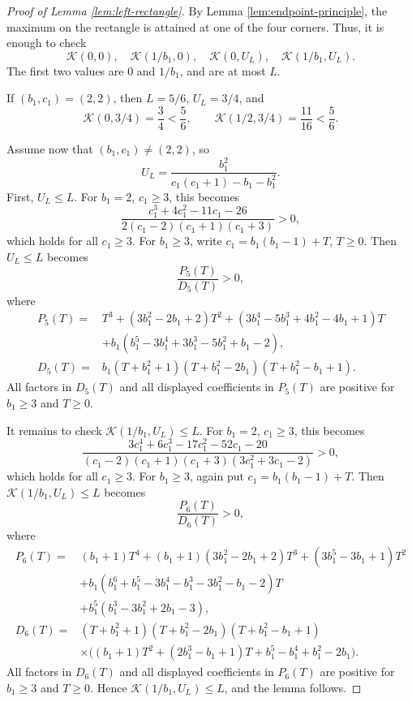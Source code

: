 \documentclass[11pt]{amsart}
\newcommand{\Kfun}{\mathcal K}
\begin{document}
\begin{proof}[Proof of Lemma \ref{lem:left-rectangle}]
By Lemma \ref{lem:endpoint-principle}, the maximum on the rectangle is attained
at one of the four corners.  Thus, it is enough to check
$$
        \Kfun(0,0),\quad
        \Kfun(1/b_1,0),\quad
        \Kfun(0,U_L),\quad
        \Kfun(1/b_1,U_L).
$$
The first two values are $0$ and $1/b_1$, and are at most $L$.

If $(b_1,c_1)=(2,2)$, then $L=5/6$, $U_L=3/4$, and
$$
        \Kfun(0,3/4)=\frac34<\frac56,
        \qquad
        \Kfun(1/2,3/4)=\frac{11}{16}<\frac56.
$$

Assume now that $(b_1,c_1)\ne(2,2)$, so
$$
        U_L=\frac{b_1^2}{c_1(c_1+1)-b_1-b_1^2}.
$$
First, $U_L\le L$.  For $b_1=2$, $c_1\geq3$, this becomes
$$
        \frac{c_1^3+4c_1^2-11c_1-26}{2(c_1-2)(c_1+1)(c_1+3)}>0,
$$
which holds for all $c_1\ge3$.
For $b_1\ge3$, write $c_1=b_1(b_1-1)+T$, $T\ge0$.  Then $U_L\le L$ becomes
$$
        \frac{P_5(T)}{D_5(T)}>0,
$$
where
\begin{align*}
P_5(T)={}&T^3+(3b_1^2-2b_1+2)T^2
        +(3b_1^4-5b_1^3+4b_1^2-4b_1+1)T\\
        &+b_1(b_1^5-3b_1^4+3b_1^3-5b_1^2+b_1-2),\\[3pt]
D_5(T)={}&b_1(T+b_1^2+1)(T+b_1^2-2b_1)(T+b_1^2-b_1+1).
\end{align*}
All factors in $D_5(T)$ and all displayed coefficients in $P_5(T)$ are positive for $b_1\ge3$ and $T\ge0$.

It remains to check $\Kfun(1/b_1,U_L)\le L$.  For $b_1=2$, $c_1\geq3$, this becomes
$$
        \frac{3c_1^4+6c_1^3-17c_1^2-52c_1-20}{(c_1-2)(c_1+1)(c_1+3)(3c_1^2+3c_1-2)}>0,
$$
which holds for all $c_1\ge3$.
For $b_1\ge3$, again put $c_1=b_1(b_1-1)+T$.  Then $\Kfun(1/b_1,U_L)\le L$ becomes
$$
        \frac{P_6(T)}{D_6(T)}>0,
$$
where
\begin{align*}
P_6(T)={}&(b_1+1)T^4+(b_1+1)(3b_1^2-2b_1+2)T^3+(3b_1^5-3b_1+1)T^2\\
        &+b_1(b_1^6+b_1^5-3b_1^4-b_1^3-3b_1^2-b_1-2)T\\
        &+b_1^5(b_1^3-3b_1^2+2b_1-3),\\[3pt]
D_6(T)={}&(T+b_1^2+1)(T+b_1^2-2b_1)(T+b_1^2-b_1+1)\\
        &\times\bigl((b_1+1)T^2+(2b_1^3-b_1+1)T+b_1^5-b_1^4+b_1^2-2b_1\bigr).
\end{align*}
All factors in $D_6(T)$ and all displayed coefficients in $P_6(T)$ are positive for $b_1\ge3$ and $T\ge0$.  Hence
$\Kfun(1/b_1,U_L)\le L$, and the lemma follows.

\end{proof}
\end{document}
